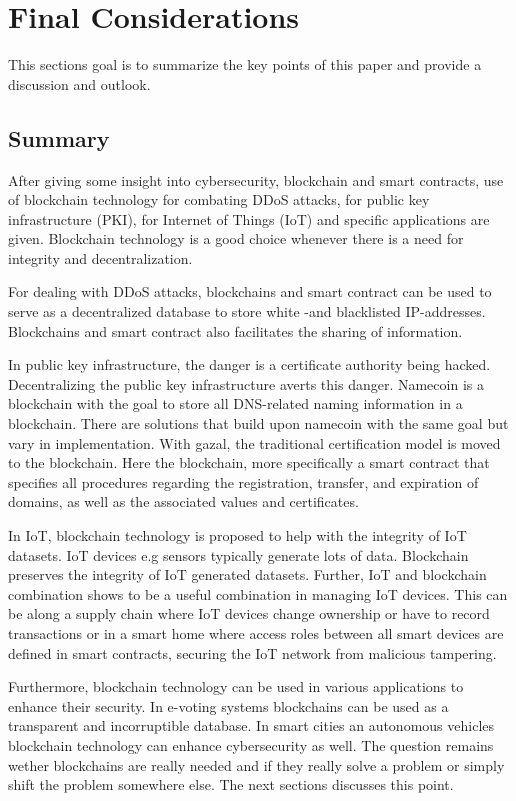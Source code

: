 \section{Final Considerations}

This sections goal is to summarize the key points of this paper and provide a discussion and outlook.
\subsection{Summary}

After giving some insight into cybersecurity, blockchain and smart contracts, use of blockchain technology for combating DDoS attacks, for public key infrastructure (PKI), for Internet of Things (IoT) and specific applications are given.
Blockchain technology is a good choice whenever there is a need for integrity and decentralization.

For dealing with DDoS attacks, blockchains and smart contract can be used to serve as a decentralized database to store white -and blacklisted IP-addresses. Blockchains and smart contract also facilitates the sharing of information.

In public key infrastructure, the danger is a certificate authority being hacked. Decentralizing  the public key infrastructure averts this danger. Namecoin is a blockchain with the goal to store all DNS-related naming information in a blockchain. There are solutions that build upon namecoin with the same goal but vary in implementation.
With gazal, the traditional certification model is moved to the blockchain. Here the blockchain, more specifically a smart contract that specifies all procedures regarding the registration, transfer, and expiration of domains, as well as the associated values and certificates.

In IoT, blockchain technology is proposed to help with the integrity of IoT datasets. IoT devices e.g sensors typically generate lots of data. Blockchain preserves the integrity of IoT generated datasets. Further, IoT and blockchain combination shows to be a useful
combination in managing IoT devices. This can be along a supply chain where IoT devices change ownership or have to record transactions or in a smart home
where access roles between all smart devices are defined in smart contracts, securing the IoT network from malicious tampering.

Furthermore, blockchain technology can be used in various applications to enhance their security.
In e-voting systems blockchains can be used as a transparent and incorruptible database.
In smart cities an autonomous vehicles blockchain technology can enhance cybersecurity as well.
The question remains wether blockchains are really needed and if they really solve a problem or simply shift the problem somewhere else.
The next sections discusses this point.

